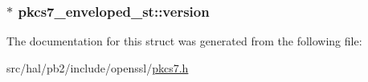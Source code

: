 \subsubsection[{\texorpdfstring{version}{version}}]{$\ast$ pkcs7\+\_\+enveloped\+\_\+st\+::version}\hypertarget{structpkcs7__enveloped__st_ae2f1117cfce2ed9ac25db876eea35c74}{}\label{structpkcs7__enveloped__st_ae2f1117cfce2ed9ac25db876eea35c74}


The documentation for this struct was generated from the following file\+:\begin{DoxyCompactItemize}
\item 
src/hal/pb2/include/openssl/\hyperlink{pkcs7_8h}{pkcs7.\+h}\end{DoxyCompactItemize}

